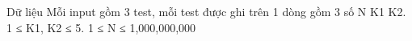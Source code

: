 Dữ liệu
Mỗi input gồm 3 test, mỗi test được ghi trên 1 dòng gồm 3 số N K1 K2. 1 ≤ K1, K2 ≤ 5. 1 ≤ N ≤ 1,000,000,000